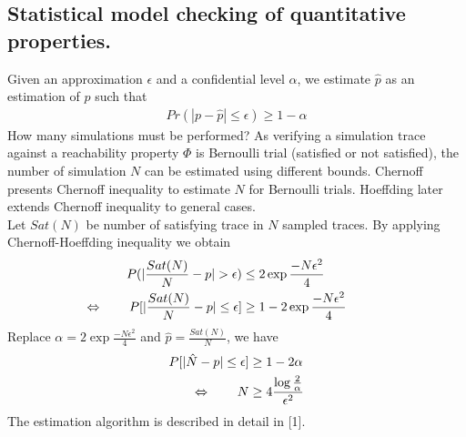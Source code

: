 \subsection{Statistical model checking of quantitative properties.}
Given an approximation $\epsilon$ and a confidential
level $\alpha$, we estimate $\hat{p}$ as an estimation of $p$ such that
\begin{align*}
    Pr(|p-\hat{p}| \leq \epsilon) \geq 1 - \alpha
\end{align*}
How many simulations must be performed?  As verifying a simulation trace against a reachability
property $\Phi$ is Bernoulli trial (satisfied or not satisfied), the number of simulation $N$ can be
estimated using different bounds. Chernoff \cite{chernoff2014career} presents Chernoff inequality to
estimate $N$ for Bernoulli trials. Hoeffding \cite{hoeffding1963probability} later extends Chernoff
inequality to general cases.\\
Let $Sat(N)$ be number of satisfying trace in $N$ sampled traces. By applying Chernoff-Hoeffding
inequality we obtain
\begin{align*}
    P(|\frac{Sat(N)}{N}-p| > \epsilon)                                    & \leq 2\exp{\frac{-N\epsilon^2}{4}}     \\
    \llap{$\Leftrightarrow$ \qquad} P[|\frac{Sat(N)}{N}-p| \leq \epsilon] & \geq 1 - 2\exp{\frac{-N\epsilon^2}{4}}
\end{align*}
Replace $\alpha = 2\exp{\frac{-N\epsilon^2}{4}}$ and $\hat{p}=\frac{Sat(N)}{N}$, we have
\begin{align*}
    P[|\hat{N} - p| \leq \epsilon]    & \geq 1 - 2\alpha                                \\
    \llap{$\Leftrightarrow$ \qquad} N & \geq 4\frac{\log{\frac{2}{\alpha}}}{\epsilon^2}
\end{align*}
The estimation algorithm is described in detail in [1].
